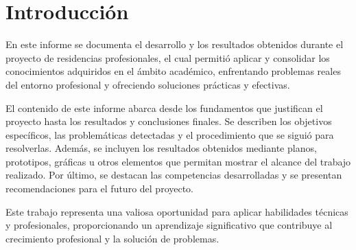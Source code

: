 \chapter{Introducción}
En este informe se documenta el desarrollo y los resultados obtenidos durante el proyecto de residencias profesionales, el cual permitió aplicar y consolidar los conocimientos adquiridos en el ámbito académico, enfrentando problemas reales del entorno profesional y ofreciendo soluciones prácticas y efectivas.

El contenido de este informe abarca desde los fundamentos que justifican el proyecto hasta los resultados y conclusiones finales. Se describen los objetivos específicos, las problemáticas detectadas y el procedimiento que se siguió para resolverlas. Además, se incluyen los resultados obtenidos mediante planos, prototipos, gráficas u otros elementos que permitan mostrar el alcance del trabajo realizado. Por último, se destacan las competencias desarrolladas y se presentan recomendaciones para el futuro del proyecto.

Este trabajo representa una valiosa oportunidad para aplicar habilidades técnicas y profesionales, proporcionando un aprendizaje significativo que contribuye al crecimiento profesional y la solución de problemas.